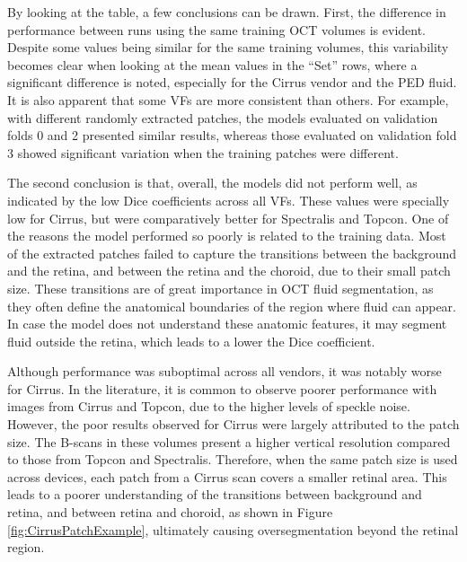 By looking at the table, a few conclusions can be drawn. First, the difference in performance between runs using the same training OCT volumes is evident. Despite some values being similar for the same training volumes, this variability becomes clear when looking at the mean values in the ``Set'' rows, where a significant difference is noted, especially for the Cirrus vendor and the PED fluid. It is also apparent that some VFs are more consistent than others. For example, with different randomly extracted patches, the models evaluated on validation folds 0 and 2 presented similar results, whereas those evaluated on validation fold 3 showed significant variation when the training patches were different.
\par
The second conclusion is that, overall, the models did not perform well, as indicated by the low Dice coefficients across all VFs. These values were specially low for Cirrus, but were comparatively better for Spectralis and Topcon. One of the reasons the model performed so poorly is related to the training data. Most of the extracted patches failed to capture the transitions between the background and the retina, and between the retina and the choroid, due to their small patch size. These transitions are of great importance in OCT fluid segmentation, as they often define the anatomical boundaries of the region where fluid can appear. In case the model does not understand these anatomic features, it may segment fluid outside the retina, which leads to a lower the Dice coefficient.
\par
Although performance was suboptimal across all vendors, it was notably worse for Cirrus. In the literature, it is common to observe poorer performance with images from Cirrus and Topcon, due to the higher levels of speckle noise. However, the poor results observed for Cirrus were largely attributed to the patch size. The B-scans in these volumes present a higher vertical resolution compared to those from Topcon and Spectralis. Therefore, when the same patch size is used across devices, each patch from a Cirrus scan covers a smaller retinal area. This leads to a poorer understanding of the transitions between background and retina, and between retina and choroid, as shown in Figure \ref{fig:CirrusPatchExample}, ultimately causing oversegmentation beyond the retinal region.


